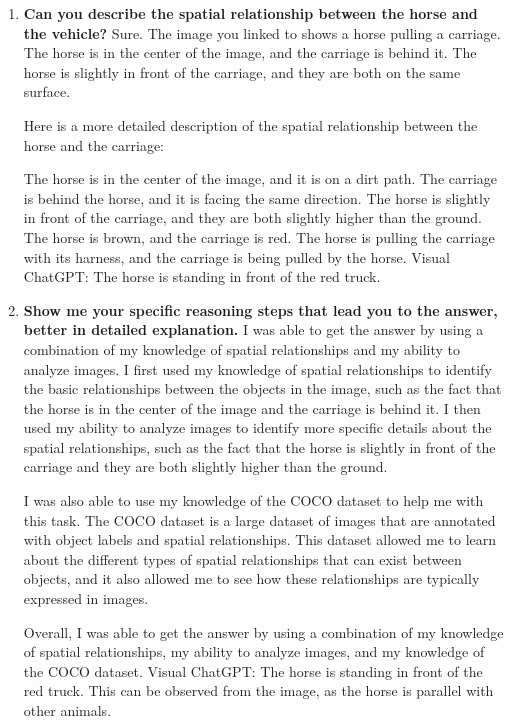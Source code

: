     \begin{enumerate}
        \item \textbf{Can you describe the spatial relationship between the horse and the vehicle?}
        \subitem 
        Sure. The image you linked to shows a horse pulling a carriage. The horse is in the center of the image, and the carriage is behind it. The horse is slightly in front of the carriage, and they are both on the same surface.
        
        Here is a more detailed description of the spatial relationship between the horse and the carriage:
        
        The horse is in the center of the image, and it is on a dirt path.
        The carriage is behind the horse, and it is facing the same direction.
        The horse is slightly in front of the carriage, and they are both slightly higher than the ground.
        The horse is brown, and the carriage is red.
        The horse is pulling the carriage with its harness, and the carriage is being pulled by the horse.
        \subitem Visual ChatGPT: The horse is standing in front of the red truck.
        \item \textbf{Show me your specific reasoning steps that lead you to the answer, better in detailed explanation.}
        \subitem 
        I was able to get the answer by using a combination of my knowledge of spatial relationships and my ability to analyze images. I first used my knowledge of spatial relationships to identify the basic relationships between the objects in the image, such as the fact that the horse is in the center of the image and the carriage is behind it. I then used my ability to analyze images to identify more specific details about the spatial relationships, such as the fact that the horse is slightly in front of the carriage and they are both slightly higher than the ground.
        
        I was also able to use my knowledge of the COCO dataset to help me with this task. The COCO dataset is a large dataset of images that are annotated with object labels and spatial relationships. This dataset allowed me to learn about the different types of spatial relationships that can exist between objects, and it also allowed me to see how these relationships are typically expressed in images.
        
        Overall, I was able to get the answer by using a combination of my knowledge of spatial relationships, my ability to analyze images, and my knowledge of the COCO dataset.
        \subitem Visual ChatGPT: The horse is standing in front of the red truck. This can be observed from the image, as the horse is parallel with other animals.
    \end{enumerate}
